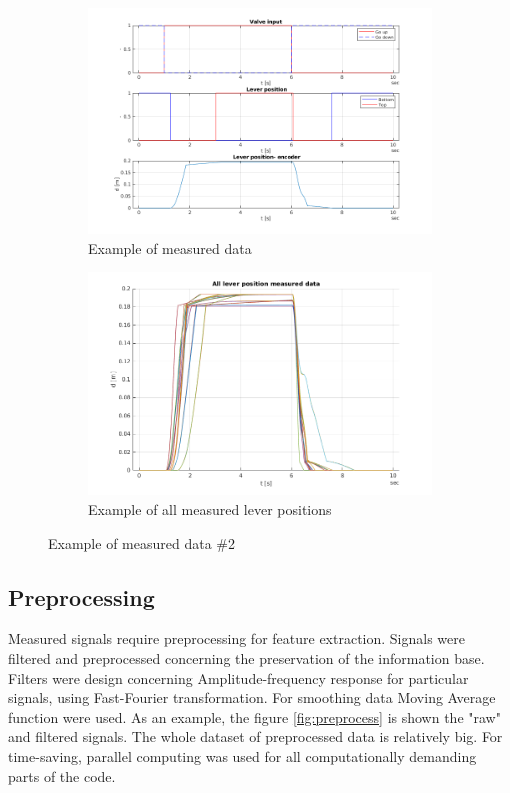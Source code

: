 \documentclass[class=article, crop=false]{standalone}
\begin{document}
\begin{figure}
    \centering    
    \begin{subfigure}{.5\textwidth}
        \centering
        \includegraphics[width=1.1\textwidth]{data_example3.png}
        \caption{Example of measured data}
    \end{subfigure}%
    \begin{subfigure}{.5\textwidth}
        \centering
        \includegraphics[width=1.1\textwidth]{lever_positions.png}
        \caption{Example of all measured lever positions}
    \end{subfigure}
    \caption{Example of measured data \#2}
    \label{fig:data_exmp2}
\end{figure}

\subsection{Preprocessing}
Measured signals require preprocessing for feature extraction. Signals were
filtered and preprocessed concerning the preservation of the information
base. Filters were design concerning Amplitude-frequency response for
particular signals, using Fast-Fourier transformation. For smoothing
data Moving Average function were used.
As an example, the figure \ref{fig:preprocess} is shown the "raw" and filtered signals.
The whole dataset of preprocessed data is relatively big. For
time-saving, parallel computing was used for all computationally
demanding parts of the code.
\end{document}
